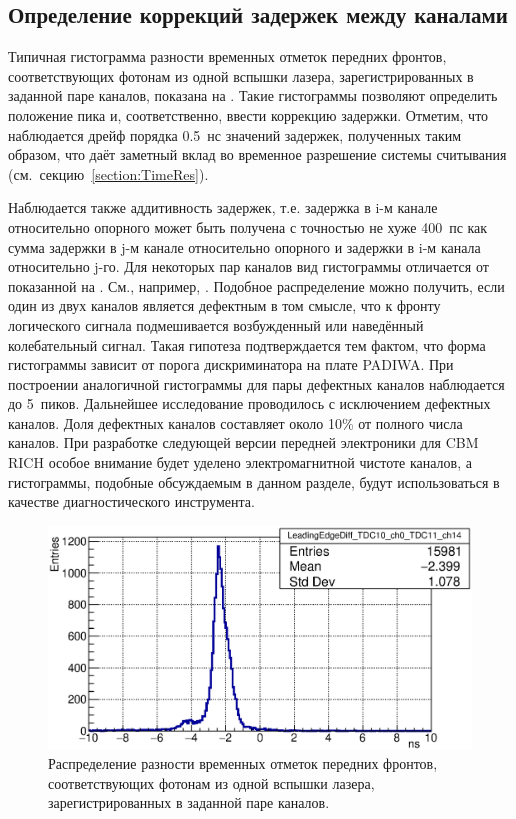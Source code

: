\subsection{Определение коррекций задержек между каналами}\label{section:Corrections}

Типичная гистограмма разности временных отметок передних фронтов, соответствующих фотонам из одной вспышки лазера, зарегистрированных в заданной паре каналов, показана на . Такие гистограммы позволяют определить положение пика и, соответственно, ввести коррекцию задержки. Отметим, что наблюдается дрейф порядка 0.5~нс значений задержек, полученных таким образом, что даёт заметный вклад во временное разрешение системы считывания (см.~секцию~\ref{section:TimeRes}).

Наблюдается также аддитивность задержек, т.е. задержка в i-м канале относительно опорного может быть получена с точностью не хуже 400~пс как сумма задержки в j-м канале относительно опорного и задержки в i-м канала относительно j-го. Для некоторых пар каналов вид гистограммы отличается от показанной на . См., например, . Подобное распределение можно получить, если один из двух каналов является дефектным в том смысле, что к фронту логического сигнала подмешивается возбужденный или наведённый колебательный сигнал. Такая гипотеза подтверждается тем фактом, что форма гистограммы зависит от порога дискриминатора на плате PADIWA. При построении аналогичной гистограммы для пары дефектных каналов наблюдается до 5~пиков. Дальнейшее исследование проводилось с исключением дефектных каналов. Доля дефектных каналов составляет около 10\% от полного числа каналов. При разработке следующей версии передней электроники для CBM RICH особое внимание будет уделено электромагнитной чистоте каналов, а гистограммы, подобные обсуждаемым в данном разделе, будут использоваться в качестве диагностического инструмента.

\begin{figure}[H]
\includegraphics[width=1.0\textwidth]{pictures/22_LeadingEdgeDiff_TDC10_ch0_TDC11_ch14_feb2017.eps}
\caption{Распределение разности временных отметок передних фронтов, соответствующих фотонам из одной вспышки лазера, зарегистрированных в заданной паре каналов.}
\label{fig:TypicalLeadingEdgeDiff}
\end{figure}

